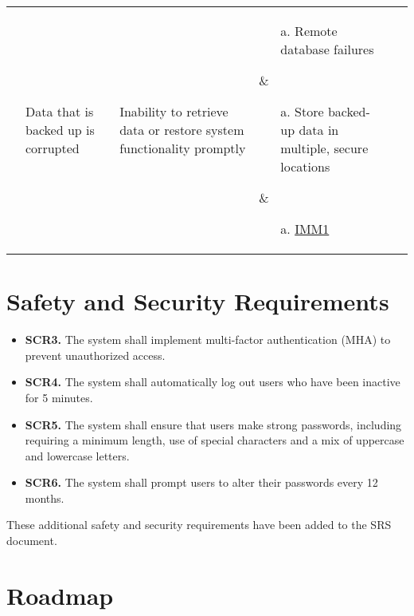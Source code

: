 \documentclass{article}
\begin{document}
\begin{landscape}
\begin{table}
\begin{tabular}{|p{2.5cm}|p{3cm}|p{3cm}|p{5cm}|p{5cm}|p{2cm}|}
&
\parbox[t]{3cm}{\raggedright Data that is backed up is corrupted} &
\parbox[t]{3cm}{\raggedright Inability to retrieve data or restore system functionality promptly} &
\parbox[t]{5cm}{\raggedright
    \begin{enumerate}
      \item[a.] Remote database failures
    \end{enumerate}
  } &
\parbox[t]{5cm}{\raggedright
    \begin{enumerate}
      \item[a.] Store backed-up data in multiple, secure locations
    \end{enumerate}
  } &
\parbox[t]{2cm}{\raggedright
    \begin{enumerate}
        \item[a.] \href{https://github.com/ausbennett/mes-finance-platform/blob/main/docs/SRS/SRS.tex\#L750}{IMM1}
    \end{enumerate}
} \\ \hline

\end{tabular}
\end{table}


\end{landscape}





\section{Safety and Security Requirements}
\begin{itemize}
    \item \textbf{SCR3.} The system shall implement multi-factor authentication (MHA) to prevent unauthorized access.
    \item \textbf{SCR4.} The system shall automatically log out users who have been inactive for 5 minutes.
    \item \textbf{SCR5.} The system shall ensure that users make strong passwords, including requiring a minimum length, use of special characters and a mix of uppercase and lowercase letters.
    \item \textbf{SCR6.} The system shall prompt users to alter their passwords every 12 months.
\end{itemize}
These additional safety and security requirements have been added to the SRS document.

\section{Roadmap}
\end{document}
